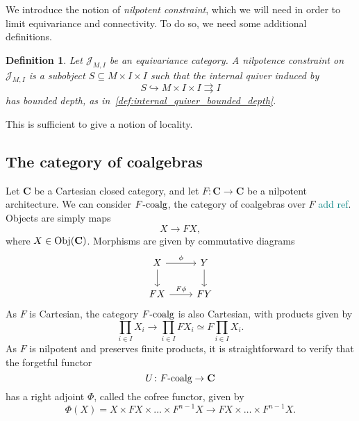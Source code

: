 \documentclass[12pt]{article}
\newtheorem{definition}{Definition}
\newcommand{\pietro}[1]{\textcolor{teal}{#1}}
\newcommand{\Obj}{{\textnormal{Obj}}}
\newcommand{\Cat}{{\mathbf{C}}}
\newcommand{\JCat}{{\mathcal{J}}}
\newcommand{\FCoalg}{{F\textnormal{-coalg}}}
\begin{document}
We introduce the notion of {\em nilpotent constraint}, which we will need in order to limit equivariance and connectivity. To do so, we need some additional definitions.

\begin{definition}\label{def:nilpotent_architecture}
    Let $\JCat_{M, I}$ be an equivariance category. A {\em nilpotence constraint} on $\JCat_{M, I}$ is a subobject $S \subseteq M \times I \times I$ such that the internal quiver induced by
    \begin{equation*}
        S \hookrightarrow M \times I \times I \rightrightarrows I
    \end{equation*}
    has bounded depth, as in~\cref{def:internal_quiver_bounded_depth}.
\end{definition}

This is sufficient to give a notion of locality.



\subsection{The category of coalgebras}

Let $\Cat$ be a Cartesian closed category, and let $F\colon \Cat \rightarrow \Cat$ be a nilpotent architecture. We can consider $\FCoalg$, the category of coalgebras over $F$ \pietro{add ref}. Objects are simply maps
\begin{equation*}
    X \rightarrow F X,
\end{equation*}
where $X \in \Obj(\Cat)$. Morphisms are given by commutative diagrams
\begin{equation*}
    \begin{tikzcd}
        X \arrow[rightarrow]{d} \arrow[rightarrow]{r}{\phi}
        & Y \arrow[rightarrow]{d} \\
        FX \arrow[rightarrow]{r}{F \phi}
        & FY
    \end{tikzcd}
\end{equation*}
As $F$ is Cartesian, the category $\FCoalg$ is also Cartesian, with products given by
\begin{equation*}
    \prod_{i \in I} X_i \rightarrow \prod_{i \in I} F X_i \simeq F \prod_{i \in I} X_i.
\end{equation*}
As $F$ is nilpotent and preserves finite products, it is straightforward to verify that the forgetful functor
\begin{equation*}
    U \colon \FCoalg \rightarrow \Cat
\end{equation*}
has a right adjoint $\Phi$, called the cofree functor, given by
\begin{equation*}
    \Phi(X) = X \times F X \times \dots \times F^{n-1} X \rightarrow F X \times \dots \times F^{n-1} X.
\end{equation*}
\end{document}
